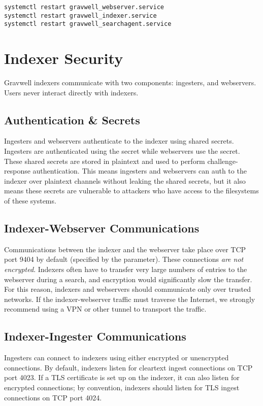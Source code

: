 \begin{Verbatim}[breaklines=true]
systemctl restart gravwell_webserver.service
systemctl restart gravwell_indexer.service
systemctl restart gravwell_searchagent.service
\end{Verbatim}

\section{Indexer Security}
Gravwell indexers communicate with two components: ingesters, and
webservers. Users never interact directly with indexers.

\subsection{Authentication \& Secrets}

Ingesters and webservers authenticate to the indexer using shared
secrets. Ingesters are authenticated using the  secret
while webservers use the  secret. These shared secrets
are stored in plaintext and used to perform challenge-response
authentication. This means ingesters and webservers can auth to the
indexer over plaintext channels without leaking the shared secrets, but
it also means these secrets are vulnerable to attackers who have access
to the filesystems of these systems.

\subsection{Indexer-Webserver Communications}

Communications between the indexer and the webserver take place over
TCP port 9404 by default (specified by the  parameter).
These connections \emph{are not encrypted}. Indexers often have to transfer
very large numbers of entries to the webserver during a search, and
encryption would significantly slow the transfer. For this reason,
indexers and webservers should communicate only over trusted networks.
If the indexer-webserver traffic must traverse the Internet, we
strongly recommend using a VPN or other tunnel to transport the
traffic.

\subsection{Indexer-Ingester Communications}

Ingesters can connect to indexers using either encrypted or unencrypted
connections. By default, indexers listen for cleartext ingest
connections on TCP port 4023. If a TLS certificate is set up on the
indexer, it can also listen for encrypted connections; by convention,
indexers should listen for TLS ingest connections on TCP port 4024.


